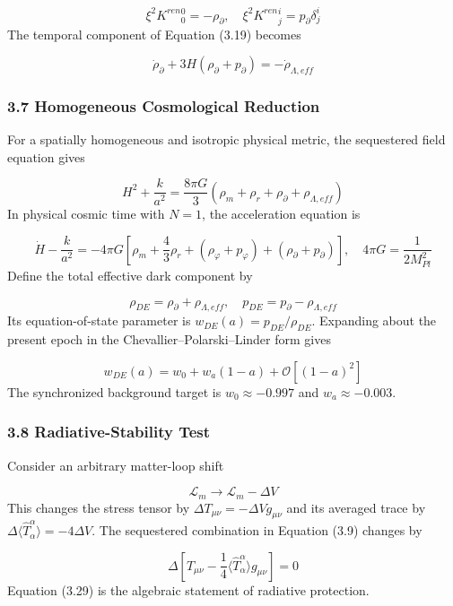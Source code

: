 \documentclass[aps,prd,onecolumn,superscriptaddress,nofootinbib,longbibliography,10pt]{revtex4-2}
\begin{document}
  \[ \xi^2 K^{ren}{}^0_0 = -\rho_\partial, \quad \xi^2 K^{ren}{}^i_j = p_\partial \delta^i_j \]
  The temporal component of Equation (3.19) becomes


  \[ \dot{\rho}_\partial + 3H(\rho_\partial + p_\partial) = -\dot{\rho}_{\Lambda,eff} \]

  
\subsubsection*{3.7 Homogeneous Cosmological Reduction}

  For a spatially homogeneous and isotropic physical metric, the sequestered field equation gives


  \[ H^2 + \frac{k}{a^2} = \frac{8\pi G}{3}(\rho_m + \rho_r + \rho_\partial + \rho_{\Lambda,eff}) \]
  In physical cosmic time with \(N = 1\), the acceleration equation is


  \[ \dot{H} - \frac{k}{a^2} = -4\pi G \left[ \rho_m + \frac{4}{3}\rho_r + (\rho_\varphi + p_\varphi) + (\rho_\partial + p_\partial) \right], \quad 4\pi G = \frac{1}{2M_{Pl}^2} \]
  Define the total effective dark component by


  \[ \rho_{DE} = \rho_\partial + \rho_{\Lambda,eff}, \quad p_{DE} = p_\partial - \rho_{\Lambda,eff} \]
  Its equation-of-state parameter is \(w_{DE}(a) = p_{DE}/\rho_{DE}\). Expanding about the present epoch in the Chevallier–Polarski–Linder form gives


  \[ w_{DE}(a) = w_0 + w_a(1 - a) + \mathcal{O}[(1 - a)^2] \]
  The synchronized background target is \(w_0 \approx -0.997\) and \(w_a \approx -0.003\).



  
\subsubsection*{3.8 Radiative-Stability Test}

  Consider an arbitrary matter-loop shift


  \[ \mathcal{L}_m \to \mathcal{L}_m - \Delta V \]
  This changes the stress tensor by \(\Delta T_{\mu\nu} = -\Delta V g_{\mu\nu}\) and its averaged trace by \(\Delta\langle \hat{T}^\alpha_\alpha \rangle = -4\Delta V\). The sequestered combination in Equation (3.9) changes by


  \[ \Delta\left[ T_{\mu\nu} - \frac{1}{4}\langle \hat{T}^\alpha_\alpha \rangle g_{\mu\nu} \right] = 0 \]
  Equation (3.29) is the algebraic statement of radiative protection.
\end{document}
